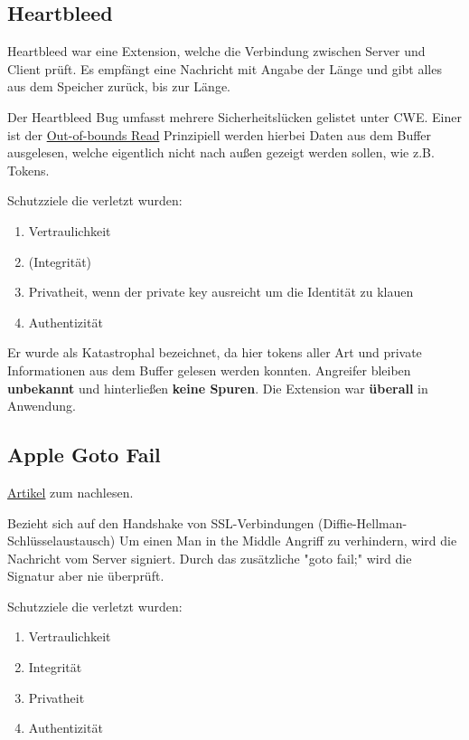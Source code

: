 \documentclass[a4paper]{article}
\begin{document}
\subsection{Heartbleed}

Heartbleed war eine Extension, welche die Verbindung zwischen Server und Client prüft. Es empfängt eine Nachricht mit Angabe der Länge und gibt alles aus dem Speicher zurück, bis zur Länge.

Der Heartbleed Bug umfasst mehrere Sicherheitslücken gelistet unter CWE. Einer ist der \href{https://cwe.mitre.org/data/definitions/125.html}{Out-of-bounds Read} Prinzipiell werden hierbei Daten aus dem Buffer ausgelesen, welche eigentlich nicht nach außen gezeigt werden sollen, wie z.B. Tokens.

Schutzziele die verletzt wurden:

\begin{enumerate}
    \item Vertraulichkeit
    \item (Integrität)
    \item Privatheit, wenn der private key ausreicht um die Identität zu klauen
    \item Authentizität
\end{enumerate}

Er wurde als Katastrophal bezeichnet, da hier tokens aller Art und private Informationen aus dem Buffer gelesen werden konnten. Angreifer bleiben \textbf{unbekannt} und hinterließen \textbf{keine Spuren}. Die Extension war \textbf{überall} in Anwendung.

\subsection{Apple Goto Fail}

\href{https://www.heise.de/hintergrund/Diverse-Personen-arbeiten-daran-diesen-Angriff-in-ihre-Tools-einzubauen-2121951.html?seite=all}{Artikel} zum nachlesen.

Bezieht sich auf den Handshake von SSL-Verbindungen (Diffie-Hellman-Schlüsselaustausch) Um einen Man in the Middle Angriff zu verhindern, wird die Nachricht vom Server signiert. Durch das zusätzliche "goto fail;" wird die Signatur aber nie überprüft. 

Schutzziele die verletzt wurden:

\begin{enumerate}
    \item Vertraulichkeit
    \item Integrität
    \item Privatheit
    \item Authentizität
\end{enumerate}
\end{document}
